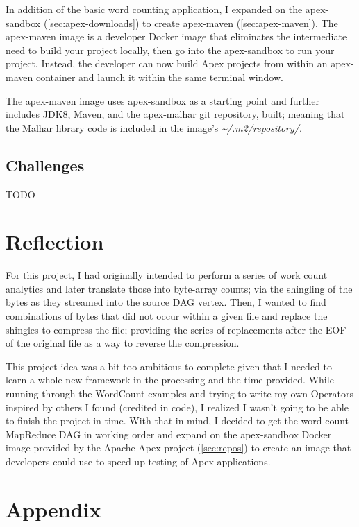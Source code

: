 \documentclass[final]{IEEEtran}
\begin{document}
In addition of the basic word counting application, I expanded on the apex-sandbox (\ref{sec:apex-downloads}) to create apex-maven (\ref{sec:apex-maven}). The apex-maven image is a developer Docker image that eliminates the intermediate need to build your project locally, then go into the apex-sandbox to run your project. Instead, the developer can now build Apex projects from within an apex-maven container and launch it within the same terminal window.

The apex-maven image uses apex-sandbox as a starting point and further includes JDK8, Maven, and the apex-malhar git repository, built; meaning that the Malhar library code is included in the image's \textsl{\textasciitilde/.m2/repository/}.

\subsection{Challenges}
TODO
\section{Reflection}
For this project, I had originally intended to perform a series of work count analytics and later translate those into byte-array counts; via the shingling of the bytes as they streamed into the source DAG vertex. Then, I wanted to find combinations of bytes that did not occur within a given file and replace the shingles to compress the file; providing the series of replacements after the EOF of the original file as a way to reverse the compression.

This project idea was a bit too ambitious to complete given that I needed to learn a whole new framework in the processing and the time provided. While running through the WordCount examples and trying to write my own Operators inspired by others I found (credited in code), I realized I wasn't going to be able to finish the project in time. With that in mind, I decided to get the word-count MapReduce DAG in working order and expand on the apex-sandbox Docker image provided by the Apache Apex project (\ref{sec:repos}) to create an image that developers could use to speed up testing of Apex applications.

\newpage
\section{Appendix}
\end{document}
